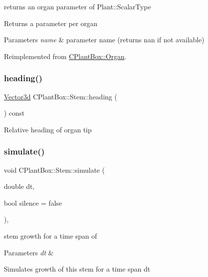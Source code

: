returns an organ parameter of Plant\+::\+Scalar\+Type 

Returns a parameter per organ


\begin{DoxyParams}{Parameters}
{\em name} & parameter name (returns nan if not available) \\
\hline
\end{DoxyParams}


Reimplemented from \hyperlink{classCPlantBox_1_1Organ_adf7d115c625341e0f6d291c750b05e5c}{C\+Plant\+Box\+::\+Organ}.

\mbox{\label{classCPlantBox_1_1Stem_ac93abfb516aeaa148cebd5ea00cf3454}} 
\subsubsection{\texorpdfstring{heading()}{heading()}}
{\footnotesize\ttfamily \hyperlink{classCPlantBox_1_1Vector3d}{Vector3d} C\+Plant\+Box\+::\+Stem\+::heading (\begin{DoxyParamCaption}{ }\end{DoxyParamCaption}) const}

Relative heading of organ tip \mbox{\label{classCPlantBox_1_1Stem_ad2f7f8607fe02dbe2f4d4335248cf90b}} 
\subsubsection{\texorpdfstring{simulate()}{simulate()}}
{\footnotesize\ttfamily void C\+Plant\+Box\+::\+Stem\+::simulate (\begin{DoxyParamCaption}\item[{double}]{dt,  }\item[{bool}]{silence = {\ttfamily false} }\end{DoxyParamCaption})\hspace{0.3cm}{\ttfamily [override]}, {\ttfamily [virtual]}}



stem growth for a time span of 


\begin{DoxyParams}{Parameters}
{\em dt} & \\
\hline
\end{DoxyParams}
Simulates growth of this stem for a time span dt


